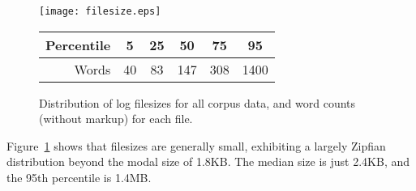 \begin{figure}[h]
    \centering
    \texttt{[image: filesize.eps]}


    \begin{tabular}{ | r | c | c | c | c | c | }
        \hline
        Percentile & 5 & 25 & 50 & 75 & 95 \\ \hline
        Words & 40 & 83 & 147 & 308 & 1400 \\ \hline
    \end{tabular}

    \caption{Distribution of log filesizes for all corpus data, and word counts (without markup) for each file.}
    \label{fig:filesizes}
\end{figure}




Figure~\ref{fig:filesizes} shows that filesizes are generally small, exhibiting a largely Zipfian distribution beyond the modal size of 1.8KB.  The median size is just 2.4KB, and the 95th percentile is 1.4MB.




